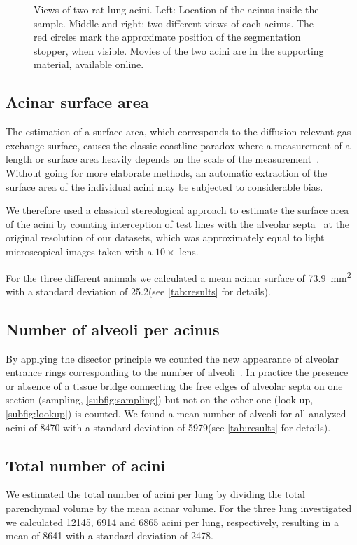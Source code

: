 \documentclass[paper=a4,twocolumn=true,DIV=calc,abstract,english]{scrartcl}
\newlength\imagescale		%
\newcommand{\totalnumberofaciniB}{12145\xspace}
\newcommand{\totalnumberofaciniD}{6914\xspace}
\newcommand{\totalnumberofaciniE}{6865\xspace}
\newcommand{\meantotalnumberofacini}{8641\xspace}
\newcommand{\meantotalnumberofaciniSTD}{2478\xspace} %
\newcommand{\meannumberofalveoli}{8470\xspace} %
\newcommand{\meannumberofalveoliSTD}{5979\xspace}
\newcommand{\meanacinarsurface}{73.9} %
\newcommand{\meanacinarsurfaceSTD}{25.2}
\begin{document}
\begin{figure}[htb]
{\begin{tikzpicture}[x=\imagescale,y=-\imagescale]
			\end{tikzpicture}%
		}%
	\caption{Views of two rat lung acini.
		Left: Location of the acinus inside the sample.
		Middle and right: two different views of each acinus.
		The red circles mark the approximate position of the segmentation stopper, when visible.
		Movies of the two acini are in the supporting material, available online.}
	\label{fig:acini}
\end{figure}

\subsection{Acinar surface area}\label{sec:results:acinar surface area}
The estimation of a surface area, which corresponds to the diffusion relevant gas exchange surface, causes the classic coastline paradox where a measurement of a length or surface area heavily depends on the scale of the measurement~\citep{Mandelbrot1967a}.
Without going for more elaborate methods, an automatic extraction of the surface area of the individual acini may be subjected to considerable bias.

We therefore used a classical stereological approach to estimate the surface area of the acini by counting interception of test lines with the alveolar septa~\citep{Hsia2010} at the original resolution of our datasets, which was approximately equal to light microscopical images taken with a \(10\times\) lens.

For the three different animals we calculated a mean acinar surface of \SI{\meanacinarsurface}{\milli\meter\squared} with a standard deviation of \meanacinarsurfaceSTD\xspace (see \autoref{tab:results} for details).

\subsection{Number of alveoli per acinus}
By applying the disector principle we counted the new appearance of alveolar entrance rings corresponding to the number of alveoli~\citep{Sterio1984,Hyde2004,Ochs2003}.
In practice the presence or absence of a tissue bridge connecting the free edges of alveolar septa on one section (sampling, \autoref{subfig:sampling}) but not on the other one (look-up, \autoref{subfig:lookup}) is counted. We found a mean number of alveoli for all analyzed acini of \meannumberofalveoli with a standard deviation of \meannumberofalveoliSTD (see \autoref{tab:results} for details).

\subsection{Total number of acini}\label{sec:results:total number of acini}
We estimated the total number of acini per lung by dividing the total parenchymal volume by the mean acinar volume.
For the three lung investigated we calculated \totalnumberofaciniB, \totalnumberofaciniD and \totalnumberofaciniE acini per lung, respectively, resulting in a mean of \meantotalnumberofacini with a standard deviation of \meantotalnumberofaciniSTD.
\end{document}
